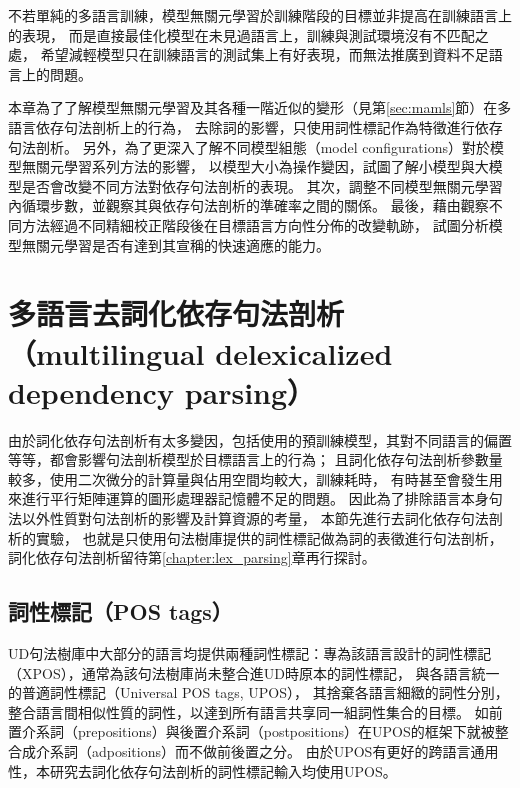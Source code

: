 不若單純的多語言訓練，模型無關元學習於訓練階段的目標並非提高在訓練語言上的表現，
而是直接最佳化模型在未見過語言上，訓練與測試環境沒有不匹配之處，
希望減輕模型只在訓練語言的測試集上有好表現，而無法推廣到資料不足語言上的問題。

本章為了了解模型無關元學習及其各種一階近似的變形（見第\ref{sec:mamls}節）在多語言依存句法剖析上的行為，
去除詞的影響，只使用詞性標記作為特徵進行依存句法剖析。
另外，為了更深入了解不同模型組態（model configurations）對於模型無關元學習系列方法的影響，
以模型大小為操作變因，試圖了解小模型與大模型是否會改變不同方法對依存句法剖析的表現。
其次，調整不同模型無關元學習內循環步數，並觀察其與依存句法剖析的準確率之間的關係。
最後，藉由觀察不同方法經過不同精細校正階段後在目標語言方向性分佈的改變軌跡，
試圖分析模型無關元學習是否有達到其宣稱的快速適應的能力。
\iffalse
尤其當目標任務缺乏資料的時候，若使用過於有表現力的假說集合，
易使模型過擬合到目標任務上，
利用相似任務進行多工學習幫助目標任務提升表現的效果尤其顯著。
然而多工學習得到的模型可以在訓練過的所有任務上的測試集有好表現，
但並未保證這樣的好表現可以轉移到相似但未見過的任務上；
而芬氏(Chelsea Finn)提出的模型無關元學習(model-agnostic meta-learning)
\cite{Finn2017ModelAgnosticMF}提供了多工學習之外的另一種方法，
將領域的歸納偏置（inductive bias）注入類神經網路中。
\fi

\section{多語言去詞化依存句法剖析（multilingual delexicalized dependency parsing）}
由於詞化依存句法剖析有太多變因，包括使用的預訓練模型，其對不同語言的偏置等等，都會影響句法剖析模型於目標語言上的行為；
且詞化依存句法剖析參數量較多，使用二次微分的計算量與佔用空間均較大，訓練耗時，
有時甚至會發生用來進行平行矩陣運算的圖形處理器記憶體不足的問題。
因此為了排除語言本身句法以外性質對句法剖析的影響及計算資源的考量，
本節先進行去詞化依存句法剖析的實驗，
也就是只使用句法樹庫提供的詞性標記做為詞的表徵進行句法剖析，
詞化依存句法剖析留待第\ref{chapter:lex_parsing}章再行探討。

\subsection{詞性標記（POS tags）}
UD句法樹庫中大部分的語言均提供兩種詞性標記：專為該語言設計的詞性標記（XPOS），通常為該句法樹庫尚未整合進UD時原本的詞性標記，
與各語言統一的普適詞性標記\cite{petrov-etal-2012-universal}（Universal POS tags, UPOS），
其捨棄各語言細緻的詞性分別，
整合語言間相似性質的詞性，以達到所有語言共享同一組詞性集合的目標。
如前置介系詞（prepositions）與後置介系詞（postpositions）在UPOS的框架下就被整合成介系詞（adpositions）而不做前後置之分。
由於UPOS有更好的跨語言通用性，本研究去詞化依存句法剖析的詞性標記輸入均使用UPOS。

